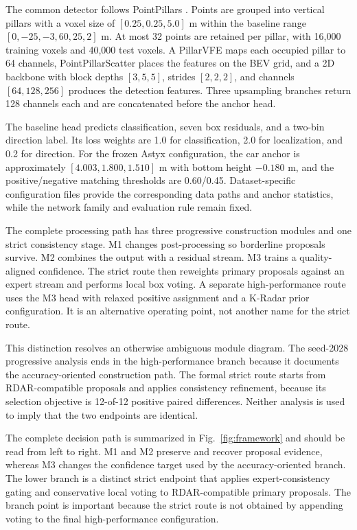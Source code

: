 \documentclass[preprint,12pt,times]{elsarticle}
\newcommand{\figref}[1]{\textcolor{floatreviewblue}{Fig.~\ref{#1}}}
\newcommand{\figref}[1]{Fig.~\ref{#1}}
\begin{document}
The common detector follows PointPillars
\cite{lang2019pointpillars}. Points are grouped into vertical pillars with a
voxel size of $[0.25,0.25,5.0]$ m within the baseline range
$[0,-25,-3,60,25,2]$ m. At most 32 points are retained per pillar, with
16,000 training voxels and 40,000 test voxels. A PillarVFE maps each occupied
pillar to 64 channels, PointPillarScatter places the features on the BEV grid,
and a 2D backbone with block depths $[3,5,5]$, strides $[2,2,2]$, and channels
$[64,128,256]$ produces the detection features. Three upsampling branches
return 128 channels each and are concatenated before the anchor head.

The baseline head predicts classification, seven box residuals, and a
two-bin direction label. Its loss weights are 1.0 for classification, 2.0 for
localization, and 0.2 for direction. For the frozen Astyx configuration, the
car anchor is approximately $[4.003,1.800,1.510]$ m with bottom height
$-0.180$ m, and the positive/negative matching thresholds are 0.60/0.45.
Dataset-specific configuration files provide the corresponding data paths and
anchor statistics, while the network family and evaluation rule remain fixed.

The complete processing path has three progressive construction modules and
one strict consistency stage. M1 changes post-processing so borderline
proposals survive. M2 combines the output with a residual stream. M3 trains a
quality-aligned confidence. The strict route then reweights primary proposals
against an expert stream and performs local box voting. A separate
high-performance route uses the M3 head with relaxed positive assignment and a
K-Radar prior configuration. It is an alternative operating point, not another
name for the strict route.

This distinction resolves an otherwise ambiguous module diagram. The
seed-2028 progressive analysis ends in the high-performance branch because it
documents the accuracy-oriented construction path. The formal strict
route starts from RDAR-compatible proposals and applies consistency refinement,
because its selection objective is 12-of-12 positive paired differences.
Neither analysis is used to imply that the two endpoints are identical.

The complete decision path is summarized in \figref{fig:framework} and should
be read from left to right. M1 and M2 preserve and recover proposal evidence,
whereas M3 changes the confidence target used by the accuracy-oriented branch.
The lower branch is a distinct strict endpoint that applies expert-consistency
gating and conservative local voting to RDAR-compatible primary proposals.
The branch point is important because the strict route is not obtained by
appending voting to the final high-performance configuration.
\end{document}
